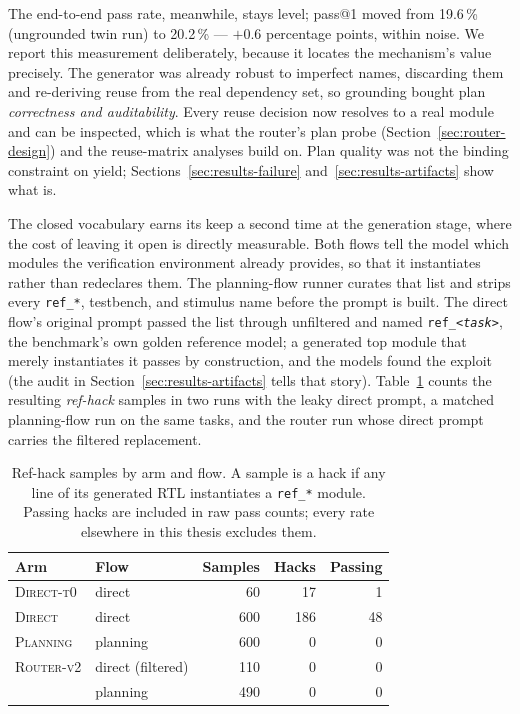 The end-to-end pass rate, meanwhile, stays level; pass@1 moved from
19.6\,\% (ungrounded twin run) to 20.2\,\% --- $+0.6$ percentage points,
within noise. We report this measurement deliberately, because it
locates the mechanism's value precisely. The generator was already
robust to imperfect names, discarding them and re-deriving reuse from
the real dependency set, so grounding bought plan
\emph{correctness and auditability}. Every reuse decision now resolves
to a real module and can be inspected, which is what the router's plan
probe (Section~\ref{sec:router-design}) and the reuse-matrix analyses build on.
Plan quality was not the binding constraint on yield;
Sections~\ref{sec:results-failure} and~\ref{sec:results-artifacts} show
what is.

The closed vocabulary earns its keep a second time at the generation
stage, where the cost of leaving it open is directly measurable. Both
flows tell the model which modules the verification environment
already provides, so that it instantiates rather than redeclares
them. The planning-flow runner curates that list and strips every
\texttt{ref\_*}, testbench, and stimulus name before the prompt is
built. The direct flow's original prompt passed the list through
unfiltered and named \texttt{ref\_\emph{<task>}}, the benchmark's own
golden reference model; a generated top module that merely
instantiates it passes by construction, and the models found the
exploit (the audit in Section~\ref{sec:results-artifacts} tells that
story). Table~\ref{tab:hack-flows} counts the resulting
\emph{ref-hack} samples in two runs with the leaky direct prompt, a
matched planning-flow run on the same tasks, and the router run whose
direct prompt carries the filtered replacement.

\begin{table}[htbp]
  \centering
  \caption[Ref-hack exploitation by arm and flow]{Ref-hack samples by
    arm and flow. A sample is a hack if any line of its generated RTL
    instantiates a \texttt{ref\_*} module. Passing hacks are included
    in raw pass counts; every rate elsewhere in this thesis excludes
    them.}
  \label{tab:hack-flows}
  \small
  \setlength{\tabcolsep}{4pt}
  \begin{tabular}{llrrr}
    \toprule
    Arm & Flow & Samples & Hacks & Passing \\
    \midrule
    \textsc{Direct-t0} & direct            & 60  & 17  & 1  \\
    \textsc{Direct}    & direct            & 600 & 186 & 48 \\
    \textsc{Planning}  & planning          & 600 & 0   & 0  \\
    \textsc{Router-v2} & direct (filtered) & 110 & 0   & 0  \\
                       & planning          & 490 & 0   & 0  \\
    \bottomrule
  \end{tabular}
\end{table}

